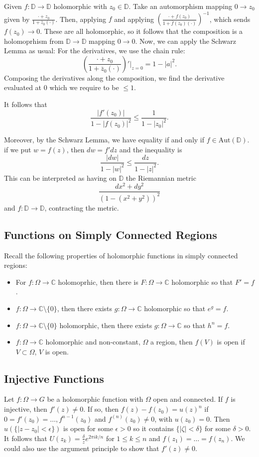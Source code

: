 \documentclass[12pt]{scrartcl}
\newcommand{\C}{\mathbb C}
\let \ol \overline
\begin{document}
Given $f: \mathbb D \to \mathbb D$ holomorphic with $z_0 \in \mathbb D$.  Take an automorphism mapping $0 \to z_0$ given by $\frac{\cdot + z_0}{1 + \ol z_0 (\cdot)}$.  Then, applying $f$ and applying $(\frac{\cdot + f(z_0)}{1 + \ol f(z_0) (\cdot)})^{-1}$, which sends $f(z_0) \to 0$.  These are all holomorphic, so it follows that the composition is a holomoprhism from $\mathbb D \to \mathbb D$ mapping $0 \to 0$.  Now, we can apply the Schwarz Lemma as usual:  For the derivatives, we use the chain rule:
$$\left (\frac{\cdot + z_0}{1 + \ol z_0 (\cdot)}\right )'\vert_{z = 0} = 1 - |a|^2.$$
Composing the derivatives along the composition, we find the derivative evaluated at $0$ which we require to be $\le 1$.

It follows that 
$$\frac{|f'(z_0)|}{1 - |f(z_0)|^2} \le \frac{1}{1 - |z_0|^2}.$$

Moreover, by the Schwarz Lemma, we have equality if and only if $f \in \text{Aut}(\mathbb D)$.  if we put $w = f(z)$, then $dw = f' dz$ and the inequality is 
$$\frac{|dw|}{1 - |w|^2} \le \frac{dz}{1 - |z|^2}.$$
This can be interpreted as having on $\mathbb D$ the Riemannian metric 
$$\frac{dx^2 + dy^2}{(1 - (x^2 + y^2))^2}$$
and $f: \mathbb D \to \mathbb D$, contracting the metric.

\subsection{Functions on Simply Connected Regions}
Recall the following properties of holomorphic functions in simply connected regions:  
\begin{itemize}
\item For $f : \Omega \to \C$ holomoprhic, then there is $F: \Omega \to \C$ holomorphic so that $F' = f$.  
\item $f : \Omega \to \C \setminus \{0\}$, then there exists $g: \Omega \to \C$ holomorphic so that $e^g = f$.  
\item $f: \Omega \to \C \setminus \{0\}$ holomorphic, then there exists $g : \Omega \to \C$ so that $h^n = f$.
\item $f: \Omega \to \C$ holomorphic and non-constant, $\Omega$ a region, then $f(V)$ is open if $V \subset \Omega$, $V$ is open.  
\end{itemize}

\subsection{Injective Functions}
Let $f: \Omega \to G$ be a holomorphic function with $\Omega$ open and connected. If $f$ is injective, then $f'(z) \ne 0$.  If so, then $f(z) - f(z_0) = u (z)^n$ if $0 = f'(z_0) = \dots, f^{n-1}(z_0)$ and $f^{(n)}(z_0) \ne 0$, with $u(z_0) = 0$.  Then $u(\{|z - z_0| < \epsilon\})$ is open for some $\epsilon > 0$ so it contains $\{|\zeta| < \delta\}$ for some $\delta > 0$.  It follows that $U(z_k) = \frac{\delta}{z} e^{2\pi i k /n}$ for $1 \le k \le n$ and $f(z_1) = \dots = f(z_n)$.  We could also use the argument principle to show that $f'(z) \ne 0$.
\end{document}
